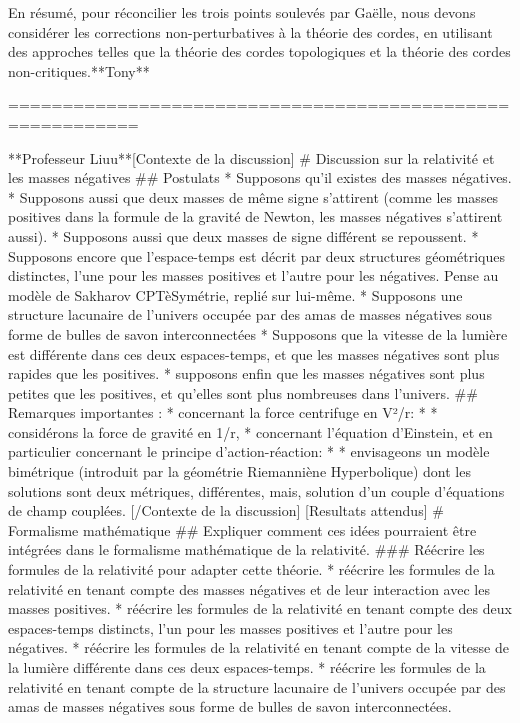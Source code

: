 En résumé, pour réconcilier les trois points soulevés par Gaëlle, nous devons considérer les corrections non-perturbatives à la théorie des cordes, en utilisant des approches telles que la théorie des cordes topologiques et la théorie des cordes non-critiques.**Tony**

==========================================================

**Professeur Liuu**[Contexte de la discussion]
# Discussion sur la relativité et les masses négatives
## Postulats
* Supposons qu'il existes des masses négatives. 
* Supposons aussi que deux masses de même signe s'attirent (comme les masses positives dans la formule de la gravité de Newton, les masses négatives s'attirent aussi). 
* Supposons aussi que deux masses de signe différent se repoussent. 
* Supposons encore que l'espace-temps est décrit par deux structures géométriques distinctes, l'une pour les masses positives et l'autre pour les négatives. 
    Pense au modèle de Sakharov CPTèSymétrie, replié sur lui-même.
* Supposons une structure lacunaire de l’univers occupée par des amas de masses négatives sous forme de bulles de savon interconnectées
* Supposons que la vitesse de la lumière est différente dans ces deux espaces-temps, et que les masses négatives sont plus rapides que les positives.
* supposons enfin que les masses négatives sont plus petites que les positives, et qu'elles sont plus nombreuses dans l'univers.
## Remarques importantes : 
* concernant la force centrifuge en V²/r:
* * considérons la force de gravité en 1/r,  
* concernant l'équation d'Einstein, et en particulier concernant le principe d'action-réaction:
* * envisageons un modèle bimétrique (introduit par la géométrie Riemanniène Hyperbolique) dont les solutions sont deux métriques, différentes, mais, solution d'un couple d'équations de champ couplées.
[/Contexte de la discussion]
[Resultats attendus]
# Formalisme mathématique
## Expliquer comment ces idées pourraient être intégrées dans le formalisme mathématique de la relativité.
### Réécrire les formules de la relativité pour adapter cette théorie.
* réécrire les formules de la relativité en tenant compte des masses négatives et de leur interaction avec les masses positives.
* réécrire les formules de la relativité en tenant compte des deux espaces-temps distincts, l'un pour les masses positives et l'autre pour les négatives.
* réécrire les formules de la relativité en tenant compte de la vitesse de la lumière différente dans ces deux espaces-temps.
* réécrire les formules de la relativité en tenant compte de la structure lacunaire de l'univers occupée par des amas de masses négatives sous forme de bulles de savon interconnectées.
